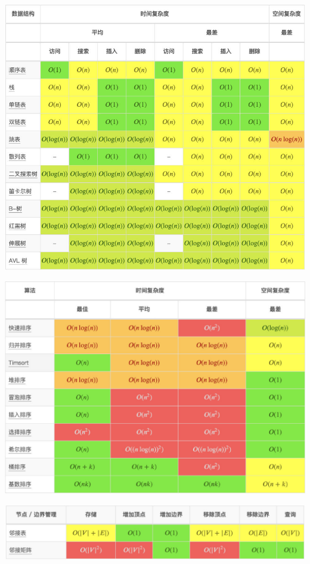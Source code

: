 \documentclass[9pt, b5paper]{article}
\begin{document}
\begin{center}
\includegraphics[width=.9\linewidth]{./pic/bigo2.jpeg}
\end{center}

\begin{center}
\includegraphics[width=.9\linewidth]{./pic/bigo3.jpeg}
\end{center}

\begin{center}
\includegraphics[width=.9\linewidth]{./pic/bigo4.jpeg}
\end{center}
\end{document}
